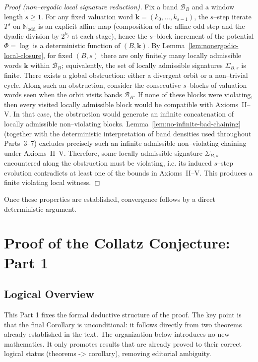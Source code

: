 \documentclass[preprint,12pt]{elsarticle}
\begin{document}
\begin{proof}[Proof (non--ergodic local signature reduction)]
Fix a band $\mathcal{B}_B$ and a window length $s\ge 1$. For any fixed valuation word $\mathbf{k}=(k_0,\dots,k_{s-1})$, the $s$--step iterate $T^s$ on $\mathbb{N}_{\mathrm{odd}}$ is an explicit affine map (composition of the affine odd step and the dyadic division by $2^{k_j}$ at each stage), hence the $s$--block increment of the potential $\Phi=\log$ is a deterministic function of $(B,\mathbf{k})$.
By Lemma~\ref{lem:nonergodic-local-closure}, for fixed $(B,s)$ there are only finitely many locally admissible words $\mathbf{k}$ within $\mathcal{B}_B$; equivalently, the set of locally admissible signatures $\Sigma_{B,s}$ is finite.
There exists a global obstruction: either a divergent orbit or a non--trivial cycle. Along such an obstruction, consider the consecutive $s$--blocks of valuation words seen when the orbit visits bands $\mathcal{B}_B$. If none of these blocks were violating, then every visited locally admissible block would be compatible with Axioms~II--V.
In that case, the obstruction would generate an infinite concatenation of locally admissible non--violating blocks. Lemma~\ref{lem:no-infinite-bad-chaining} (together with the deterministic interpretation of band densities used throughout Parts~3--7) excludes precisely such an infinite admissible non--violating chaining under Axioms~II--V.
Therefore, some locally admissible signature $\Sigma_{B,s}$ encountered along the obstruction must be violating, i.e. its induced $s$--step evolution contradicts at least one of the bounds in Axioms~II--V. This produces a finite violating local witness.
\end{proof}

Once these properties are established, convergence follows by a direct deterministic argument.
\section{Proof of the Collatz Conjecture: Part 1}
\subsection{Logical Overview}
This Part 1 fixes the formal deductive structure of the proof. The key point is that the final Corollary is unconditional: it follows directly from two theorems already established in the text.
The organization below introduces no new mathematics. It only promotes results that are already proved to their correct logical status (theorems -> corollary), removing editorial ambiguity.
\end{document}
